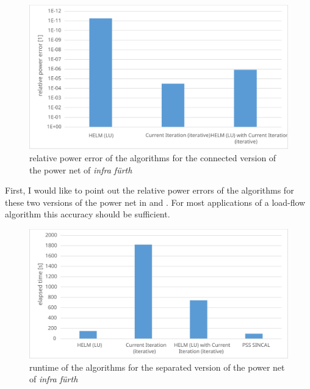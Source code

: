 \begin{figure}
	\centering
	\includegraphics[scale=0.7]{figures/big_net_combined_relative_power_error}
	\caption[Comparison, \emph{infra fürth}, connected, error]{relative power error of the algorithms for the connected version of the power net of \emph{infra fürth}}
	\label{fig:big_net_combined_relative_power_error}
\end{figure}

First, I would like to point out the relative power errors of the algorithms for these two versions of the power net in  and . For most applications of a load-flow algorithm this accuracy should be sufficient.

\begin{figure}
	\centering
	\includegraphics[scale=0.7]{figures/big_net_separate_runtime}
	\caption[Comparison, \emph{infra fürth}, separate, runtime]{runtime of the algorithms for the separated version of the power net of \emph{infra fürth}}
	\label{fig:big_net_separate_runtime}
\end{figure}


